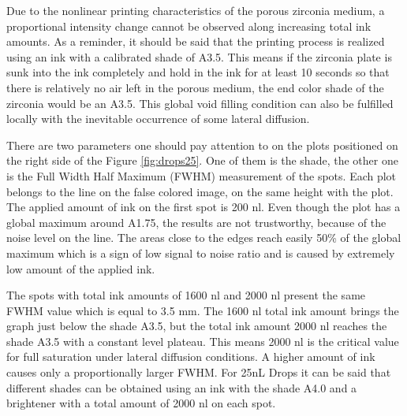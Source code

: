\bigskip 

Due to the nonlinear printing characteristics of the porous zirconia medium, a proportional intensity change cannot be observed along increasing total ink amounts. As a reminder, it should be said that the printing process is realized using an ink with a calibrated shade of A3.5. This means if the zirconia plate is sunk into the ink completely and hold in the ink for at least 10 seconds so that there is relatively no air left in the porous medium, the end color shade of the zirconia would be an A3.5. This global void filling condition can also be fulfilled locally with the inevitable occurrence of some lateral diffusion. 

There are two parameters one should pay attention to on the plots positioned on the right side of the Figure \ref{fig:drops25}. One of them is the shade, the other one is the Full Width Half Maximum (FWHM) measurement of the spots. Each plot belongs to the line on the false colored image, on the same height with the plot. The applied amount of ink on the first spot is 200 nl. Even though the plot has a global maximum around A1.75, the results are not trustworthy, because of the noise level on the line. The areas close to the edges reach easily 50\% of the global maximum which is a sign of low signal to noise ratio and is caused by extremely low amount of the applied ink. 

The spots with total ink amounts of 1600 nl and 2000 nl present the same FWHM value which is equal to 3.5 mm. The 1600 nl total ink amount brings the graph just below the shade A3.5, but the total ink amount 2000 nl reaches the shade A3.5 with a constant level plateau. This means 2000 nl is the critical value for full saturation under lateral diffusion conditions. A higher amount of ink causes only a proportionally larger FWHM. For 25nL Drops it can be said that different shades can be obtained using an ink with the shade A4.0 and a brightener with a total amount of 2000 nl on each spot.

\bigskip


